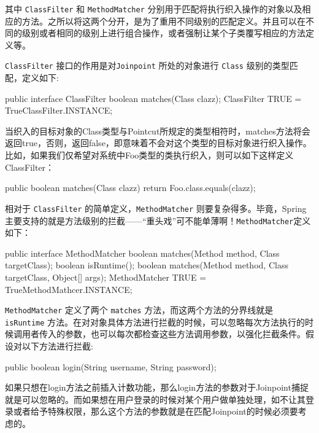 其中 \texttt{ClassFilter} 和 \texttt{MethodMatcher} 分别用于匹配将执行织入操作的对象以及相应的方法。之所以将这两个分开，是为了重用不同级别的匹配定义。并且可以在不同的级别或者相同的级别上进行组合操作，或者强制让某个子类覆写相应的方法定义等。

\texttt{ClassFilter} 接口的作用是对\texttt{Joinpoint} 所处的对象进行 \texttt{Class} 级别的类型匹配，定义如下:

\begin{Java}
public interface ClassFilter {
    boolean matches(Class clazz);
    ClassFilter TRUE = TrueClassFilter.INSTANCE;
}
\end{Java}

当织入的目标对象的Class类型与Pointcut所规定的类型相符时，matches方法将会返回true，否则，返回false，即意味着不会对这个类型的目标对象进行织入操作。比如，如果我们仅希望对系统中Foo类型的类执行织入，则可以如下这样定义ClassFilter：

\begin{Java}
public boolean matches(Class clazz) {
    return Foo.class.equals(clazz);
}
\end{Java}

相对于 \texttt{ClassFilter} 的简单定义，\texttt{MethodMatcher} 则要复杂得多。毕竟，Spring主要支持的就是方法级别的拦截——“重头戏”可不能单薄啊！\texttt{MethodMatcher}定义如下：

\begin{Java}
public interface MethodMatcher {
    boolean matches(Method method, Class targetClass);
    boolean isRuntime();
    boolean matches(Method method, Class targetClass, Object[] args);
    MethodMatcher TRUE = TrueMethodMathcer.INSTANCE;
}      
\end{Java}

\texttt{MethodMatcher} 定义了两个 \texttt{matches} 方法，而这两个方法的分界线就是 \texttt{isRuntime} 方法。在对对象具体方法进行拦截的时候，可以忽略每次方法执行的时候调用者传入的参数，也可以每次都检查这些方法调用参数，以强化拦截条件。假设对以下方法进行拦截:

\begin{Java}
public boolean login(String username, String password);
\end{Java}

如果只想在login方法之前插入计数功能，那么login方法的参数对于Joinpoint捕捉就是可以忽略的。而如果想在用户登录的时候对某个用户做单独处理，如不让其登录或者给予特殊权限，那么这个方法的参数就是在匹配Joinpoint的时候必须要考虑的。

